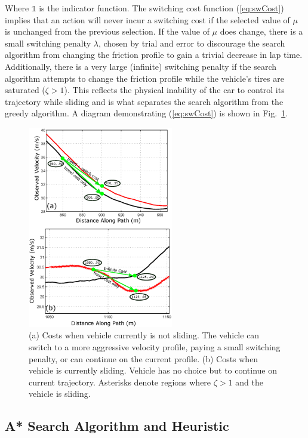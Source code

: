 \documentclass[9pt,shortpaper,twoside,web]{ieeecolor}
\begin{document}
Where $\mathds{1}$ is the indicator function. The switching cost function (\ref{eq:swCost}) implies that an action will never
incur a switching cost if the selected value of $\mu$ is unchanged from the previous selection. If the value of $\mu$ does change, there
is a small switching penalty $\lambda$, chosen by trial and error to discourage the search algorithm from changing the friction profile to gain a
trivial decrease in lap time. Additionally, there is a very large (infinite) switching penalty if the search algorithm attempts to change the
friction profile while the vehicle's tires are saturated ($\zeta > 1$). This reflects the physical inability of the car to control its
trajectory while sliding and is what separates the search algorithm from the greedy algorithm. A diagram demonstrating (\ref{eq:swCost})
is shown in Fig.~\ref{fig:swCost}. 

 \begin{figure}[tb]
\centering
\includegraphics[width=2.5in]{figures/switchCost.eps}
\caption[Costs when vehicle is and is not sliding.]{(a) Costs when vehicle currently is not sliding. The vehicle can switch to a more aggressive velocity profile, paying a small
switching penalty, or can continue on the current profile. (b) Costs when vehicle is currently sliding. Vehicle has no choice but to continue on current
trajectory. Asterisks denote regions where $\zeta > 1$ and the vehicle is sliding.}
\label{fig:swCost}
\end{figure} 

\subsection{A* Search Algorithm and Heuristic}
\label{sec:ch5astarheuristic}
\end{document}
